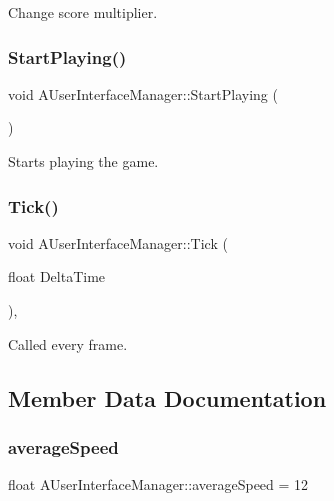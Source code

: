 Change score multiplier. 

\mbox{\label{class_a_user_interface_manager_a6a4122a2113d920c0e38588059a68839}} 
\subsubsection{StartPlaying()}
{\footnotesize\ttfamily void A\+User\+Interface\+Manager\+::\+Start\+Playing (\begin{DoxyParamCaption}{ }\end{DoxyParamCaption})}



Starts playing the game. 

\mbox{\label{class_a_user_interface_manager_a37044120f159092a04b598a4f4b83643}} 
\subsubsection{Tick()}
{\footnotesize\ttfamily void A\+User\+Interface\+Manager\+::\+Tick (\begin{DoxyParamCaption}\item[{float}]{Delta\+Time }\end{DoxyParamCaption})\hspace{0.3cm}{\ttfamily [override]}, {\ttfamily [virtual]}}



Called every frame. 



\subsection{Member Data Documentation}
\mbox{\label{class_a_user_interface_manager_a15dcc4b8103484d37051511adbdf0632}} 
\subsubsection{averageSpeed}
{\footnotesize\ttfamily float A\+User\+Interface\+Manager\+::average\+Speed = 12\hspace{0.3cm}{\ttfamily [private]}}

